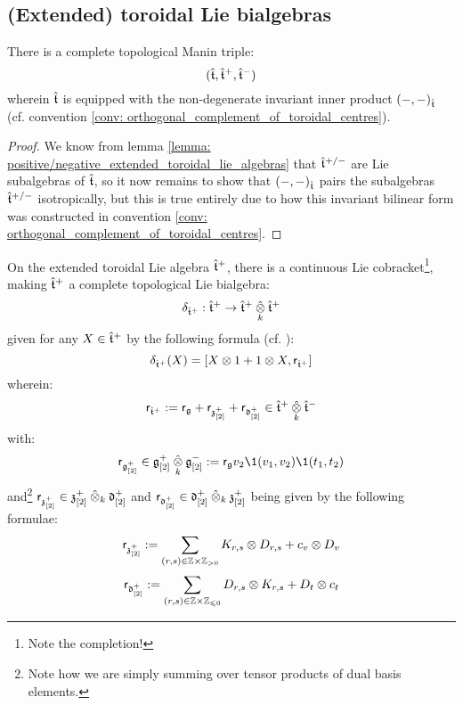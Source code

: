     \subsection{(Extended) toroidal Lie bialgebras}
        \begin{theorem} \label{theorem: extended_toroidal_manin_triples}
            There is a complete topological Manin triple:
                $$(\hat{\mathfrak{t}}, \hat{\mathfrak{t}}^{+}, \hat{\mathfrak{t}}^{-})$$
            wherein $\hat{\mathfrak{t}}$ is equipped with the non-degenerate invariant inner product $(-, -)_{\hat{\mathfrak{t}}}$ (cf. convention \ref{conv: orthogonal_complement_of_toroidal_centres}).
        \end{theorem}
            \begin{proof}
                We know from lemma \ref{lemma: positive/negative_extended_toroidal_lie_algebras} that $\hat{\mathfrak{t}}^{+/-}$ are Lie subalgebras of $\hat{\mathfrak{t}}$, so it now remains to show that $(-, -)_{\hat{\mathfrak{t}}}$ pairs the subalgebras $\hat{\mathfrak{t}}^{+/-}$ isotropically, but this is true entirely due to how this invariant bilinear form was constructed in convention \ref{conv: orthogonal_complement_of_toroidal_centres}.
            \end{proof}
        \begin{corollary} \label{coro: extended_toroidal_lie_bialgebras}
            On the extended toroidal Lie algebra $\hat{\mathfrak{t}}^{+}$, there is a continuous Lie cobracket\footnote{Note the completion!}, making $\hat{\mathfrak{t}}^{+}$ a complete topological Lie bialgebra:
                $$\delta_{\extendedtoroidal^{\positive}}: \extendedtoroidal^{\positive} \to \extendedtoroidal^{\positive} \hattensor_k \extendedtoroidal^{\positive}$$
            given for any $X \in \hat{\mathfrak{t}}^{+}$ by the following formula (cf. \cite{etingof_kazhdan_quantisation_1}):
                $$\delta_{\extendedtoroidal^{\positive}}(X) = [ X \tensor 1 + 1 \tensor X, \sfr_{\extendedtoroidal^{\positive}} ]$$
            wherein:
                $$\sfr_{\extendedtoroidal^{\positive}} := \sfr_{\g} + \sfr_{\z_{[2]}^{\positive}} + \sfr_{\d_{[2]}^{\positive}} \in \extendedtoroidal^{\positive} \hattensor_k \extendedtoroidal^{\negative}$$
            with:
                $$\sfr_{\g_{[2]}^{\positive}} \in \g_{[2]}^{\positive} \hattensor_k \g_{[2]}^{\negative} := \sfr_{\g} v_2 \1(v_1, v_2) \1(t_1, t_2)$$
            and\footnote{Note how we are simply summing over tensor products of dual basis elements.} $\sfr_{\z_{[2]}^{\positive}} \in \z_{[2]}^{\positive} \hattensor_k \d_{[2]}^{\positive}$ and $\sfr_{\d_{[2]}^{\positive}} \in \d_{[2]}^{\positive} \hattensor_k \z_{[2]}^{\positive}$ being given by the following formulae:
                $$\sfr_{\z_{[2]}^{\positive}} := \sum_{(r, s) \in \Z \x \Z_{> 0}} K_{r, s} \tensor D_{r, s} + c_v \tensor D_v$$
                $$\sfr_{\d_{[2]}^{\positive}} := \sum_{(r, s) \in \Z \x \Z_{\leq 0}} D_{r, s} \tensor K_{r, s} + D_t \tensor c_t$$
        \end{corollary}
    
